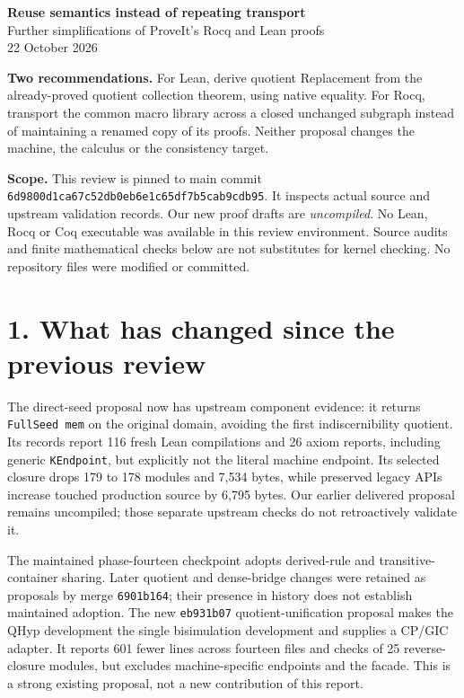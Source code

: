 \documentclass[10pt]{article}
\newcommand{\code}[1]{\texttt{#1}}
\begin{document}
\begin{center}{\Large\bfseries Reuse semantics instead of repeating transport}\\[6pt]
Further simplifications of ProveIt's Rocq and Lean proofs\\22 October 2026\end{center}
\textbf{Two recommendations.} For Lean, derive quotient Replacement from the already-proved quotient collection theorem, using native equality. For Rocq, transport the common macro library across a closed unchanged subgraph instead of maintaining a renamed copy of its proofs. Neither proposal changes the machine, the calculus or the consistency target.

\textbf{Scope.} This review is pinned to main commit
\code{6d9800d1ca67c52db0eb6e1c65df7b5cab9cdb95}. It inspects actual source and upstream validation records. Our new proof drafts are \emph{uncompiled}. No Lean, Rocq or Coq executable was available in this review environment. Source audits and finite mathematical checks below are not substitutes for kernel checking. No repository files were modified or committed.

\section*{1. What has changed since the previous review}
The direct-seed proposal now has upstream component evidence: it returns \code{FullSeed mem} on the original domain, avoiding the first indiscernibility quotient. Its records report 116 fresh Lean compilations and 26 axiom reports, including generic \code{KEndpoint}, but explicitly not the literal machine endpoint. Its selected closure drops 179 to 178 modules and 7,534 bytes, while preserved legacy APIs increase touched production source by 6,795 bytes. Our earlier delivered proposal remains uncompiled; those separate upstream checks do not retroactively validate it.

The maintained phase-fourteen checkpoint adopts derived-rule and transitive-container sharing. Later quotient and dense-bridge changes were retained as proposals by merge \code{6901b164}; their presence in history does not establish maintained adoption. The new \code{eb931b07} quotient-unification proposal makes the QHyp development the single bisimulation development and supplies a CP/GIC adapter. It reports 601 fewer lines across fourteen files and checks of 25 reverse-closure modules, but excludes machine-specific endpoints and the facade. This is a strong existing proposal, not a new contribution of this report.
\end{document}
